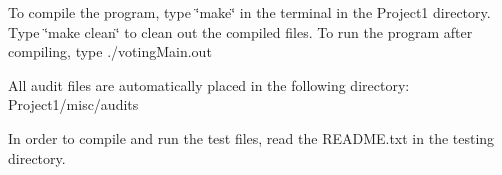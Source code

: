 To compile the program, type \char`\"{}make\char`\"{} in the terminal in the Project1 directory. Type \char`\"{}make clean\char`\"{} to clean out the compiled files. To run the program after compiling, type ./voting\+Main.out

All audit files are automatically placed in the following directory\+: Project1/misc/audits

In order to compile and run the test files, read the README.\+txt in the testing directory. 